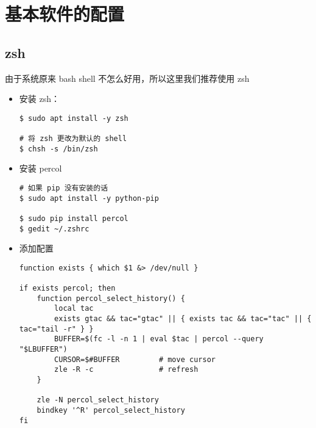 \chapter{基本软件的配置}
\section{zsh}
由于系统原来 bash shell 不怎么好用，所以这里我们推荐使用 zsh \\

\begin{itemize}
\item 安装 zsh：
\begin{lstlisting}
$ sudo apt install -y zsh

# 将 zsh 更改为默认的 shell 
$ chsh -s /bin/zsh 
\end{lstlisting}

\item 安装 percol
\begin{lstlisting}
# 如果 pip 没有安装的话
$ sudo apt install -y python-pip
 
$ sudo pip install percol
$ gedit ~/.zshrc 
\end{lstlisting}

\item 添加配置
\begin{lstlisting}
function exists { which $1 &> /dev/null }

if exists percol; then
    function percol_select_history() {
        local tac
        exists gtac && tac="gtac" || { exists tac && tac="tac" || { tac="tail -r" } }
        BUFFER=$(fc -l -n 1 | eval $tac | percol --query "$LBUFFER")
        CURSOR=$#BUFFER         # move cursor
        zle -R -c               # refresh
    }

    zle -N percol_select_history
    bindkey '^R' percol_select_history
fi
\end{lstlisting}
\end{itemize}
\newpage

